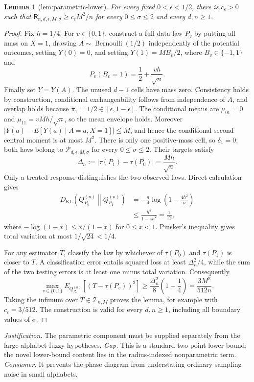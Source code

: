 \documentclass{article}
\newtheorem{lemma}{Lemma}
\begin{document}
\begin{lemma}[lem:parametric-lower]\label{lem:parametric-lower}
For every fixed \(0<\epsilon<1/2\), there is \(c_{\epsilon}>0\) such that \(\mathsf R_{n,d,\epsilon,M,\sigma}\ge c_{\epsilon}M^2/n\) for every \(0\le\sigma\le2\) and every \(d,n\ge1\).
\end{lemma}
\begin{proof}
Fix \(h=1/4\).  For \(v\in\{0,1\}\), construct a full-data law \(P_v\) by putting all mass on \(X=1\), drawing \(A\sim\operatorname{Bernoulli}(1/2)\) independently of the potential outcomes, setting \(Y(0)=0\), and setting \(Y(1)=MB_v/2\), where \(B_v\in\{-1,1\}\) and
\[
 P_v(B_v=1)=\frac12+\frac{vh}{\sqrt n}.
\tag{1}
\]
Finally set \(Y=Y(A)\).  The unused \(d-1\) cells have mass zero.  Consistency holds by construction, conditional exchangeability follows from independence of \(A\), and overlap holds because \(\pi_1=1/2\in[\epsilon,1-\epsilon]\).  The conditional means are \(\mu_{01}=0\) and \(\mu_{11}=vMh/\sqrt n\), so the mean envelope holds.  Moreover \(|Y(a)-E[Y(a)\mid A=a,X=1]|\le M\), and hence the conditional second central moment is at most \(M^2\).  There is only one positive-mass cell, so \(\delta_1=0\); both laws belong to \(\mathcal P_{d,\epsilon,M,\sigma}\) for every \(0\le\sigma\le2\).  Their targets satisfy
\[
 \Delta_n:=|\tau(P_1)-\tau(P_0)|=\frac{Mh}{\sqrt n}.
\tag{2}
\]
Only a treated response distinguishes the two observed laws.  Direct calculation gives
\[
\begin{aligned}
 D_{\mathrm{KL}}\!\left(Q_{P_0}^{(n)}\middle\|Q_{P_1}^{(n)}\right)
 &=-\frac n4\log\left(1-\frac{4h^2}{n}\right)\\
 &\le \frac{h^2}{1-4h^2}=\frac1{12},
\end{aligned}
\tag{3}
\]
where \(-\log(1-x)\le x/(1-x)\) for \(0\le x<1\).  Pinsker's inequality gives total variation at most \(1/\sqrt{24}<1/4\).

For any estimator \(T\), classify the law by whichever of \(\tau(P_0)\) and \(\tau(P_1)\) is closer to \(T\).  A classification error entails squared loss at least \(\Delta_n^2/4\), while the sum of the two testing errors is at least one minus total variation.  Consequently
\[
 \max_{v\in\{0,1\}}E_{Q_{P_v}^{(n)}}[(T-\tau(P_v))^2]
 \ge \frac{\Delta_n^2}{8}\left(1-\frac14\right)
 =\frac{3M^2}{512n}.
\tag{4}
\]
Taking the infimum over \(T\in\mathcal T_{n,M}\) proves the lemma, for example with \(c_{\epsilon}=3/512\).  The construction is valid for every \(d,n\ge1\), including all boundary values of \(\sigma\).
\end{proof}
\par\smallskip\noindent \textit{Justification.} The parametric component must be supplied separately from the large-alphabet fuzzy hypotheses. \textit{Gap.} This is a standard two-point lower bound; the novel lower-bound content lies in the radius-indexed nonparametric term. \textit{Consumer.} It prevents the phase diagram from understating ordinary sampling noise in small alphabets.
\end{document}
